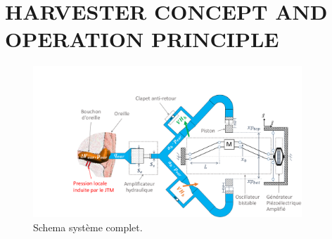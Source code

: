\documentclass[3p,twocolumn,preprint]{elsarticle}
\begin{document}
\newpage
\section{HARVESTER CONCEPT AND OPERATION PRINCIPLE}
\label{OPERATION PRINCIPLE}
\lipsum[1]
\begin{figure}[!htbp]
	\centering
	\captionsetup{justification=centering}
	\includegraphics[trim={0cm 0cm 0cm 0cm},clip, width=0.9\textwidth]{figures/schema_systeme_complet.pdf}
	\caption{Schema système complet.}
	\label{fig:schema_systeme_complet}
\end{figure}
\end{document}

